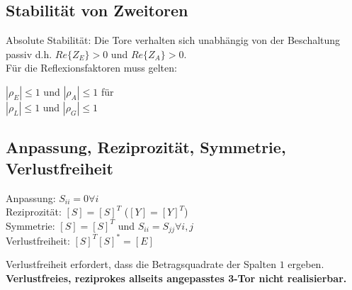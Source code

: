\documentclass[english]{latex4ei/latex4ei_sheet}
\begin{document}
\begin{sectionbox}
	\subsection{Stabilität von Zweitoren}
	Absolute Stabilität: Die Tore verhalten sich unabhängig von der Beschaltung passiv d.h. $Re\{Z_E\} > 0$ und $Re\{Z_A\} > 0$.\\
	Für die Reflexionsfaktoren muss gelten:\\
	\begin{emphbox}
		$|\rho_E| \leq  1$ und $|\rho_A| \leq  1$ für\\
		
		$|\rho_L| \leq  1$ und $|\rho_G| \leq  1$
	\end{emphbox}
\end{sectionbox}



\begin{sectionbox}
	\subsection{Anpassung, Reziprozität, Symmetrie, Verlustfreiheit}
	\begin{emphbox}
		Anpassung: $S_{ii} = 0 \forall i$\\
		Reziprozität: $[S] = [S]^T$ ($[Y] = [Y]^T$)\\
		Symmetrie: $[S] = [S]^T$ und $S_{ii} = S_{jj} \forall i,j$\\
		Verlustfreiheit: $[S]^T[S]^* = [E]$
	\end{emphbox}
	Verlustfreiheit erfordert, dass die Betragsquadrate der Spalten $1$ ergeben.\\
	\textbf{Verlustfreies, reziprokes allseits angepasstes 3-Tor nicht realisierbar.}
\end{sectionbox}
\end{document}
